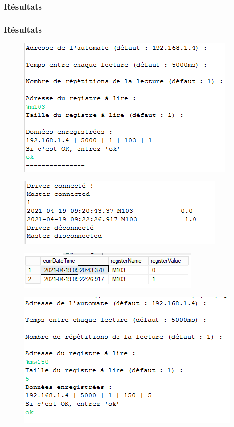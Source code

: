 \documentclass[12pt]{beamer}
\begin{document}
	\subsubsection{Résultats}
	\begin{frame}[allowframebreaks]
	\frametitle{Résultats}
		\begin{figure}[H]
			\centering
			\includegraphics[scale=0.25]{test1.png}
			\label{fig:test1}
		\end{figure}
		
		\begin{figure}[H]
			\centering
			\includegraphics[scale=0.3]{test3.png}
			\label{fig:test3}
		\end{figure}
		
		\begin{figure}[H]
			\centering
			\includegraphics[scale=0.4]{dataBase2.png}
			\label{fig:db2}
		\end{figure}

		\begin{figure}[H]
			\centering
			\includegraphics[scale=0.3]{test4.png}
			\label{fig:test4}
		\end{figure}
		

\end{frame}
\end{document}
